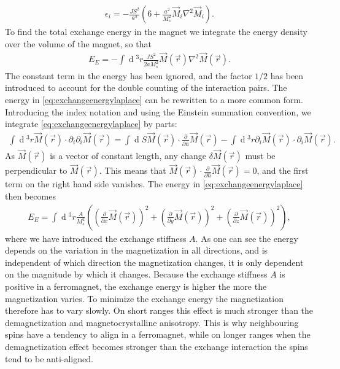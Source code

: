 \documentclass[12pt, a4paper, twoside, openright]{article}		%
\renewcommand{\d}[1]{\ensuremath{\operatorname{d}\!{#1}}}
\numberwithin{equation}{section}
\begin{document}
\begin{align}
\epsilon_i = -\frac{JS^2}{a^3}\left(6+\frac{a^2}{M_s^2}\vec{M}_i\nabla^2\vec{M}_i\right).
\end{align}
To find the total exchange energy in the magnet we integrate the energy density over the volume of the magnet, so that
\begin{align}
\label{eq:exchangeenergylaplace}
E_E = -\int \d {^3}r \frac{JS^2}{2aM_s^2} \vec{M}(\vec{r})\nabla^2\vec{M}(\vec{r}).
\end{align}
The constant term in the energy has been ignored, and the factor $1/2$ has been introduced to account for the double counting of the interaction pairs. The energy in \eqref{eq:exchangeenergylaplace} can be rewritten to a more common form. Introducing the index notation and using the Einstein summation convention, we integrate \eqref{eq:exchangeenergylaplace} by parts: 
\begin{align}
\label{eq:exchangeenergyDiv2}
\int \d {^3}r \vec{M}(\vec{r})\cdot\partial_i \partial_i \vec{M}(\vec{r}) = \int \d S \vec{M}(\vec{r})\cdot \frac{\partial}{\partial \hat{n}}\vec{M}(\vec{r}) - \int \d {^3}r \partial_i  \vec{M}(\vec{r})\cdot\partial_i \vec{M}(\vec{r}).
\end{align}
As $\vec{M}(\vec{r})$ is a vector of constant length, any change $\delta \vec{M}(\vec{r})$ must be perpendicular to $\vec{M}(\vec{r})$. This means that $\vec{M}(\vec{r})\cdot \frac{\partial}{\partial \hat{n}}\vec{M}(\vec{r}) = 0$, and the first term on the right hand side vanishes. The energy in \eqref{eq:exchangeenergylaplace} then becomes
\begin{align}
\label{eq:exchangeenergy}
E_E = \int \d {^3}r \frac{A}{M_s^2} \left((\frac{\partial}{\partial x}\vec{M}(\vec{r}))^2+(\frac{\partial}{\partial y}\vec{M}(\vec{r}))^2+(\frac{\partial}{\partial z}\vec{M}(\vec{r}))^2\right),
\end{align}
where we have introduced the exchange stiffness $A$. As one can see the energy depends on the variation in the magnetization in all directions, and is independent of which direction the magnetization changes, it is only dependent on the magnitude by which it changes. Because the exchange stiffness $A$ is positive in a ferromagnet, the exchange energy is higher the more the magnetization varies. To minimize the exchange energy the magnetization therefore has to vary slowly. On short ranges this effect is much stronger than the demagnetization and magnetocrystalline anisotropy. This is why neighbouring spins have a tendency to align in a ferromagnet, while on longer ranges when the demagnetization effect becomes stronger than the exchange interaction the spins tend to be anti-aligned.
\end{document}
